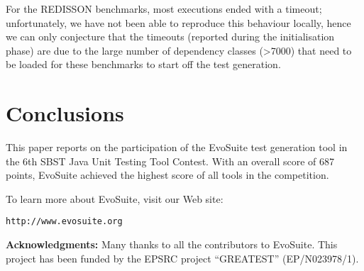 \documentclass[sigconf,table]{acmart}
\newcommand{\TODO}[1]{\textbf{\textcolor{ScarletRed}{[TODO: #1]}}\xspace}
\newcommand{\TODO}[1]{}
\newcommand{\EVOSUITE}{{\sc EvoSuite}\xspace}
\newcommand{\TOTALPOINTS}{{687}\xspace}
\begin{document}
For the REDISSON benchmarks, most
executions ended with a timeout; unfortunately, we have not been able
to reproduce this behaviour locally, hence we can only conjecture that
the timeouts (reported during the initialisation phase) are due to the
large number of dependency classes (>7000) that need to be loaded for
these benchmarks to start off the test generation.


\section{Conclusions}

This paper reports on the participation of the \EVOSUITE test
generation tool in the 6th SBST Java Unit Testing Tool Contest. With
an overall score of \TOTALPOINTS points, \EVOSUITE achieved the highest score
of all tools in the competition.


To learn more about \EVOSUITE, visit our Web site:
\begin{center}
\texttt{http://www.evosuite.org}
\end{center}



\textbf{Acknowledgments:} Many thanks to all the contributors to \EVOSUITE.
This project has been funded by the EPSRC
project ``GREATEST'' (EP/N023978/1).




\balance
\end{document}
